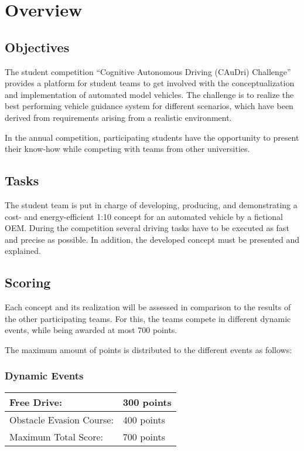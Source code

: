 \chapter{Overview}

\section{Objectives}

The student competition “Cognitive Autonomous Driving (CAuDri) Challenge”
provides a platform for student teams to get involved with the
conceptualization and implementation of automated model vehicles. The challenge
is to realize the best performing vehicle guidance system for different
scenarios, which have been derived from requirements arising from a realistic
environment.

In the annual competition, participating students have the opportunity to
present their know-how while competing with teams from other universities.

\section{Tasks}

The student team is put in charge of developing, producing, and demonstrating a
cost- and energy-efficient 1:10 concept for an automated vehicle by a fictional
OEM. During the competition several driving tasks have to be executed as fast
and precise as possible. In addition, the developed concept must be presented
and explained.

\section{Scoring}

Each concept and its realization will be assessed in comparison to the results
of the other participating teams. For this, the teams compete in different
dynamic events, while being awarded at most 700 points.

The maximum amount of points is distributed to the different events as follows:

\subsection{Dynamic Events}

\begin{table}[h]
	\begin{tabular}{|l|l|}
		\hline
		Free Drive:  & 300 points \\ \hline
		Obstacle Evasion Course: & 400 points \\ \hline\hline
		Maximum Total Score:     & 700 points \\ \hline
	\end{tabular}
\end{table}